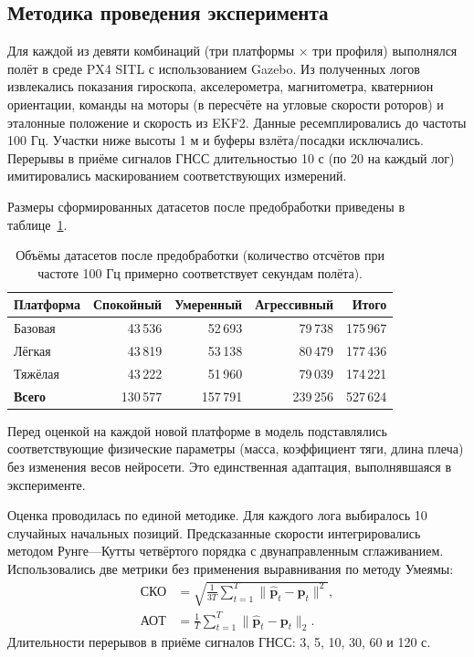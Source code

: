 \subsection{Методика проведения эксперимента}

Для каждой из девяти комбинаций (три платформы × три профиля) выполнялся полёт в среде PX4 SITL с использованием Gazebo. Из полученных логов извлекались показания гироскопа, акселерометра, магнитометра, кватернион ориентации, команды на моторы (в пересчёте на угловые скорости роторов) и эталонные положение и скорость из EKF2. Данные ресемплировались до частоты 100 Гц. Участки ниже высоты 1 м и буферы взлёта/посадки исключались. Перерывы в приёме сигналов ГНСС длительностью 10 с (по 20 на каждый лог) имитировались маскированием соответствующих измерений. 

Размеры сформированных датасетов после предобработки приведены в таблице~\ref{tab:dataset_sizes}.

\begin{table}[htbp]
	\centering
	\caption{Объёмы датасетов после предобработки (количество отсчётов при частоте 100 Гц примерно соответствует секундам полёта).}
	\label{tab:dataset_sizes}
	\begin{tabular}{lrrrr}
		\toprule
		\textbf{Платформа} & \textbf{Спокойный} & \textbf{Умеренный} &
		\textbf{Агрессивный} & \textbf{Итого} \\
		\midrule
		Базовая        & 43\,536 & 52\,693 & 79\,738 & 175\,967 \\
		Лёгкая & 43\,819 & 53\,138 & 80\,479 & 177\,436 \\
		Тяжёлая & 43\,222 & 51\,960 & 79\,039 & 174\,221 \\
		\midrule
		\textbf{Всего}       & 130\,577 & 157\,791 & 239\,256 & 527\,624 \\
		\bottomrule
	\end{tabular}
\end{table}

Перед оценкой на каждой новой платформе в модель подставлялись соответствующие физические параметры (масса, коэффициент тяги, длина плеча) без изменения весов нейросети. Это единственная адаптация, выполнявшаяся в эксперименте.

Оценка проводилась по единой методике. Для каждого лога выбиралось 10 случайных начальных позиций. Предсказанные скорости интегрировались методом Рунге—Кутты четвёртого порядка с двунаправленным сглаживанием. Использовались две метрики без применения выравнивания по методу Умеямы:
\begin{align}
	\text{СКО} &= \sqrt{\frac{1}{3T}\sum_{t=1}^{T}\|\hat{\mathbf{p}}_t - \mathbf{p}_t\|^2}, \\
	\text{АОТ} &= \frac{1}{T}\sum_{t=1}^{T}\|\hat{\mathbf{p}}_t - \mathbf{p}_t\|_2.
\end{align}
Длительности перерывов в приёме сигналов ГНСС: 3, 5, 10, 30, 60 и 120 с.


